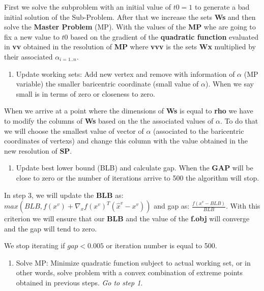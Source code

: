 \documentclass[]{article}
\providecommand{\tightlist}{%
  \setlength{\itemsep}{0pt}\setlength{\parskip}{0pt}}
\begin{document}
First we solve the subproblem with an initial value of \(t0 = 1\) to
generate a bad initial solution of the Sub-Problem. After that we
increase the sets \textbf{Ws} and then solve the \textbf{Master Problem}
(MP). With the values of the \textbf{MP} whe are going to fix a new
value to \(t0\) based on the gradient of the \textbf{quadratic function}
evaluated in \textbf{vv} obtained in the resolution of \textbf{MP} where
\textbf{vvv} is the sets \textbf{Wx} multiplied by their associated
\(\alpha_{i = 1..n}\).

\begin{enumerate}
\def\labelenumi{\arabic{enumi})}
\setcounter{enumi}{1}
\tightlist
\item
  Update working sets: Add new vertex and remove with information of
  \(\alpha\) (MP variable) the smaller baricentric coordinate (small
  value of \(\alpha\)). When we say small is in terms of zero or
  closeness to zero.
\end{enumerate}

When we arrive at a point where the dimensions of \textbf{Ws} is equal
to \textbf{rho} we have to modify the columns of \textbf{Ws} based on
the the associated values of \(\alpha\). To do that we will choose the
smallest value of vector of \(\alpha\) (associated to the baricentric
coordinates of vertexs) and change this column with the value obtained
in the new resolution of \textbf{SP}.

\begin{enumerate}
\def\labelenumi{\arabic{enumi})}
\setcounter{enumi}{2}
\tightlist
\item
  Update best lower bound (BLB) and calculate gap. When the \textbf{GAP}
  will be close to zero or the number of iterations arrive to 500 the
  algorithm will stop.
\end{enumerate}

In step 3, we will update the \textbf{BLB} as:
\(max(BLB,f(x^v)+\nabla_xf(x^v)^T(\hat{x}^v-x^v))\) and gap as:
\(\frac{f(x^v-BLB)}{BLB}\). With this criterion we will ensure that our
\textbf{BLB} and the value of the \textbf{f.obj} will converge and the
gap will tend to zero.

We stop iterating if \(gap < 0.005\) or iteration number is equal to
500.

\begin{enumerate}
\def\labelenumi{\arabic{enumi})}
\setcounter{enumi}{3}
\tightlist
\item
  Solve MP: Minimize quadratic function subject to actual working set,
  or in other words, solve problem with a convex combination of extreme
  points obtained in previous steps. \emph{Go to step 1}.
\end{enumerate}
\end{document}
